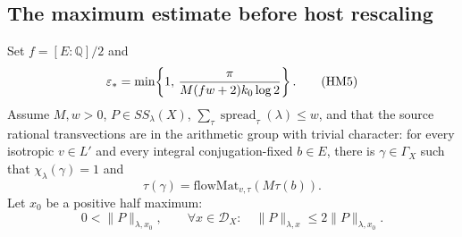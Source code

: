 \subsection{The maximum estimate before host rescaling}
Set \(f=[E:\mathbb Q]/2\) and
\[
 \varepsilon_*=\min\!\left\{1,\,
 {\pi\over M(fw+2)k_0\log2}\right\}.
 \tag{HM5}\label{eq:sr-source-epstar}
\]
Assume \(M,w>0\), \(P\in SS_\lambda(X)\),
\(\sum_\tau\operatorname{spread}_\tau(\lambda)\le w\), and that
the source rational transvections are in the arithmetic group
with trivial character:
for every isotropic \(v\in L'\) and every integral
conjugation-fixed \(b\in E\), there is \(\gamma\in\Gamma_X\)
such that \(\chi_\lambda(\gamma)=1\) and
\[
                  \tau(\gamma)=\mathrm{flowMat}_{v,\tau}
                                                  (M\tau(b)).
 \tag{HM6}\label{eq:sr-source-flow-period}
\]
Let \(x_0\) be a positive half maximum:
\[
 0<\|P\|_{\lambda,x_0},\qquad
 \forall x\in\mathcal D_X:\quad
                 \|P\|_{\lambda,x}\le2\|P\|_{\lambda,x_0}.
 \tag{HM7}\label{eq:sr-source-half-max}
\]

